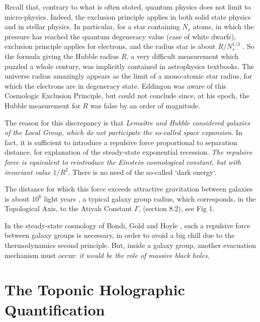 \documentclass[twoside,draft]{article}
\begin{document}
\begin{sloppypar}
Recall that, contrary to what is often stated, quantum physics does not limit to micro-physics. Indeed, the exclusion principle applies in both solid state physics and in stellar physics. In particular, for a star containing $N_s$ atoms, in which the pressure has reached the quantum degeneracy value (case of white dwarfs), exclusion principle applies for electrons, and the radius star is about $R/N_{s}^{1/3}$ \cite{Sanchez1}. So the formula giving the Hubble radius $R$, a very difficult measurement which puzzled a whole century, was implicitly contained in astrophysics textbooks. 
The universe radius amazingly appears as the limit of a mono-atomic star radius, for which the electrons are in degeneracy state. Eddingon was aware of this Cosmologic Exclusion Principle, but could not conclude since, at his epoch, the Hubble measurement for $R$ was false by an order of magnitude.

The reason for this discrepancy is that \textit{Lema\^itre and Hubble considered galaxies of the Local Group, which do not participate the so-called space expansion}. In fact, it is sufficient to introduce a repulsive force proportional to separation distance, for explanation of the steady-state exponential recession. \textit{The repulsive force is equivalent to reintroduce  the Einstein cosmological constant, but with invariant value} $1/R^{2}$. There is no need of the so-called `dark energy`.

The distance for which this force exceeds attractive gravitation between galaxies is about $10^{6}$ light years \cite{Sanchez1}, a typical galaxy group radius, which corresponds, in the Topological Axis, to the Atiyah Constant $\Gamma$, (section 8.2), see Fig 1.

In the steady-state cosmology of Bondi, Gold and Hoyle \cite{Sanchez1}, such a repulsive force between galaxy groups is necessary, in order to avoid a big chill due to the thermodynamics second principle. But, inside a galaxy group, another evacuation mechanism must occur: \textit{it would be the role of massive black holes}.

\section{The Toponic Holographic Quantification}


\end{sloppypar}
\end{document}
